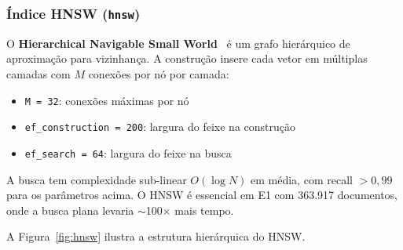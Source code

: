 \documentclass[12pt,a4paper]{article}
\begin{document}
\subsubsection{Índice HNSW (\texttt{hnsw})}

O \textbf{Hierarchical Navigable Small World}~\cite{malkov:20} é um grafo
hierárquico de aproximação para vizinhança. A construção insere cada vetor em
múltiplas camadas com $M$ conexões por nó por camada:
\begin{itemize}
  \item \texttt{M = 32}: conexões máximas por nó
  \item \texttt{ef\_construction = 200}: largura do feixe na construção
  \item \texttt{ef\_search = 64}: largura do feixe na busca
\end{itemize}

A busca tem complexidade sub-linear $O(\log N)$ em média, com recall $> 0{,}99$
para os parâmetros acima. O HNSW é essencial em E1 com 363.917 documentos, onde
a busca plana levaria $\sim$100$\times$ mais tempo.

A Figura~\ref{fig:hnsw} ilustra a estrutura hierárquica do HNSW.
\end{document}
